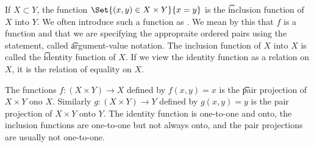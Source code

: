 
If $X \subset Y$, the function $\Set{(x, y) \in X \times Y}{x = y}$ is the \t{inclusion function} of $X$ into $Y$.
We often introduce such a function as .
We mean by this that $f$ is a function and that we are specifying the appropraite ordered pairs using the statement, called \t{argument-value notation}.
The inclusion function of $X$ into $X$ is called the \t{identity function} of $X$.
If we view the identity function as a relation on $X$, it is the relation of equality on $X$.

The functions $f: (X \times Y) \to X$ defined by $f(x, y) = x$ is the \t{pair projection} of $X \times Y$ ono $X$.
Similarly $g: (X \times Y) \to Y$ defined by $g(x, y) = y$ is the pair projection of $X \times Y$ onto $Y$.
The identity function is one-to-one and onto, the inclusion functions are one-to-one but not always onto, and the pair projections are usually not one-to-one.


%
%
%
%


%
%
%
%
%
%
%

